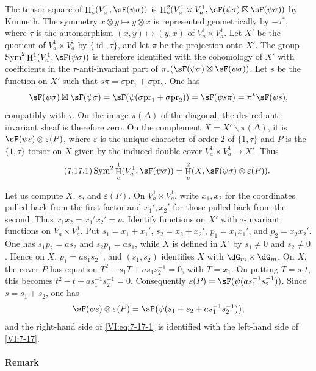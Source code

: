 \documentclass[12pt,oneside,english]{smfbook}
\DeclareMathOperator{\h}{H}
\newcounter{char}
\renewcommand{\setminus}{\smallsetminus}
\newcommand{\pr}{\mathrm{pr}} %
\begin{document}
The tensor square of $\h_c^1(V_a^1,\sF(\psi\sigma))$ is $\h_c^2(V_a^1\times V_a^1, \sF(\psi\sigma)\boxtimes\sF(\psi\sigma))$ by Künneth. The symmetry $x\otimes y\mapsto y\otimes x$ is represented geometrically by $-\tau^\ast$, where $\tau$ is the automorphism $(x,y)\mapsto(y,x)$ of $V_a^1\times V_a^1$. Let $X'$ be the quotient of $V_a^1\times V_a^1$ by $\{\operatorname{id},\tau\}$, and let $\pi$ be the projection onto $X'$. The group $\operatorname{Sym}^2\h_c^1(V_a^1,\sF(\psi\sigma))$ is therefore identified with the cohomology of $X'$ with coefficients in the $\tau$-anti-invariant part of $\pi_\ast(\sF(\psi\sigma)\boxtimes\sF(\psi\sigma))$. Let $s$ be the function on $X'$ such that $s\pi=\sigma\pr_1+\sigma\pr_2$. One has
\[
  \sF(\psi\sigma)\boxtimes\sF(\psi\sigma)
  =\sF(\psi(\sigma\pr_1+\sigma\pr_2))
  =\sF(\psi s\pi)=\pi^\ast\sF(\psi s),
\]
compatibly with $\tau$. On the image $\pi(\Delta)$ of the diagonal, the desired anti-invariant sheaf is therefore zero. On the complement $X=X'\setminus\pi(\Delta)$, it is $\sF(\psi s)\otimes\varepsilon(P)$, where $\varepsilon$ is the unique character of order $2$ of $\{1,\tau\}$ and $P$ is the $\{1,\tau\}$-torsor on $X$ given by the induced double cover $V_a^1\times V_a^1\to X'$. Thus
\begin{equation*}\tag{7.17.1}\label{VI:eq:7-17-1}
  \operatorname{Sym}^2 \h_c^1(V_a^1,\sF(\psi\sigma)) = \h_c^2(X,\sF(\psi\sigma)\otimes \varepsilon(P)) \text{.}
\end{equation*}

Let us compute $X$, $s$, and $\varepsilon(P)$. On $V_a^1\times V_a^1$, write $x_1,x_2$ for the coordinates pulled back from the first factor and $x_1',x_2'$ for those pulled back from the second. Thus $x_1x_2=x_1'x_2'=a$. Identify functions on $X'$ with $\tau$-invariant functions on $V_a^1\times V_a^1$. Put $s_1=x_1+x_1'$, $s_2=x_2+x_2'$, $p_1=x_1x_1'$, and $p_2=x_2x_2'$. One has $s_1p_2=as_2$ and $s_2p_1=as_1$, while $X$ is defined in $X'$ by $s_1\ne0$ and $s_2\ne0$. Hence on $X$, $p_1=as_1s_2^{-1}$, and $(s_1,s_2)$ identifies $X$ with $\dG_m\times\dG_m$. On $X$, the cover $P$ has equation $T^2-s_1T+as_1s_2^{-1}=0$, with $T=x_1$. On putting $T=s_1t$, this becomes $t^2-t+as_1^{-1}s_2^{-1}=0$. Consequently $\varepsilon(P)=\sF(\psi(as_1^{-1}s_2^{-1}))$. Since $s=s_1+s_2$, one has
\[
  \sF(\psi s)\otimes\varepsilon(P)
  =\sF\bigl(\psi(s_1+s_2+as_1^{-1}s_2^{-1})\bigr),
\]
and the right-hand side of \eqref{VI:eq:7-17-1} is identified with the left-hand side of \ref{VI:7-17}.

\paragraph{Remark}
\end{document}
